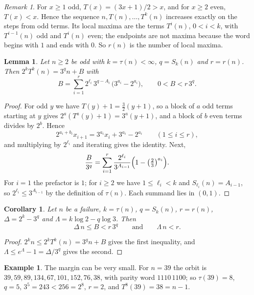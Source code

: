 \documentclass[11pt]{amsart}
\newtheorem{lemma}[theorem]{Lemma}
\newtheorem{corollary}[theorem]{Corollary}
\theoremstyle{definition}
\newtheorem{example}[theorem]{Example}
\theoremstyle{remark}
\newtheorem{remark}[theorem]{Remark}
\begin{document}
\begin{remark}\label{rem:maxima}
For $x\ge1$ odd, $T(x)=(3x+1)/2>x$, and for $x\ge2$ even, $T(x)<x$. Hence the sequence $n,T(n),\dots,T^{k}(n)$ increases exactly on the steps from odd terms. Its local maxima are the terms $T^{i}(n)$, $0<i<k$, with $T^{i-1}(n)$ odd and $T^{i}(n)$ even; the endpoints are not maxima because the word begins with $1$ and ends with $0$. So $r(n)$ is the number of local maxima.
\end{remark}

\begin{lemma}\label{lem:additive}
Let $n\ge2$ be odd with $k=\tau(n)<\infty$, $q=S_k(n)$ and $r=r(n)$. Then $2^{k}T^{k}(n)=3^{q}n+B$ with
\[
B=\sum_{i=1}^{r}2^{\ell_i}\,3^{q-A_i}\,\bigl(3^{a_i}-2^{a_i}\bigr),\qquad 0<B<r\,3^{q}.
\]
\end{lemma}

\begin{proof}
For odd $y$ we have $T(y)+1=\tfrac32(y+1)$, so a block of $a$ odd terms starting at $y$ gives $2^{a}(T^{a}(y)+1)=3^{a}(y+1)$, and a block of $b$ even terms divides by $2^{b}$. Hence
\[
2^{a_i+b_i}x_{i+1}=3^{a_i}x_i+3^{a_i}-2^{a_i}\qquad(1\le i\le r),
\]
and multiplying by $2^{\ell_i}$ and iterating gives the identity. Next,
\[
\frac{B}{3^{q}}=\sum_{i=1}^{r}\frac{2^{\ell_i}}{3^{A_{i-1}}}\Bigl(1-\bigl(\tfrac23\bigr)^{a_i}\Bigr).
\]
For $i=1$ the prefactor is $1$; for $i\ge2$ we have $1\le\ell_i<k$ and $S_{\ell_i}(n)=A_{i-1}$, so $2^{\ell_i}\le3^{A_{i-1}}$ by the definition of $\tau(n)$. Each summand lies in $(0,1)$.
\end{proof}

\begin{corollary}\label{cor:failure}
Let $n$ be a failure, $k=\tau(n)$, $q=S_k(n)$, $r=r(n)$, $\Delta=2^{k}-3^{q}$ and $\Lambda=k\log2-q\log3$. Then
\[
\Delta\, n\le B<r\,3^{q}\qquad\text{and}\qquad \Lambda\, n<r .
\]
\end{corollary}

\begin{proof}
$2^{k}n\le2^{k}T^{k}(n)=3^{q}n+B$ gives the first inequality, and $\Lambda\le e^{\Lambda}-1=\Delta/3^{q}$ gives the second.
\end{proof}

\begin{example}\label{ex:39}
The margin can be very small. For $n=39$ the orbit is $39,59,89,134,67,101,152,76,38$, with parity word $1110\,1100$; so $\tau(39)=8$, $q=5$, $3^{5}=243<256=2^{8}$, $r=2$, and $T^{8}(39)=38=n-1$.
\end{example}
\end{document}
